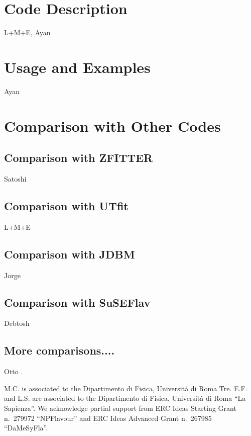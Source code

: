 \documentclass[aps,superscriptaddress,nofootinbib,floatfix,notitlepage]{revtex4-1}
\begin{document}
\section{Code Description}
\label{sec:Code}
L+M+E, Ayan
\section{Usage and Examples}
\label{sec:Usage}
Ayan
\section{Comparison with Other Codes}
\label{sec:Comparison}

\subsection{Comparison with ZFITTER}
\label{sec:ZFitter}
Satoshi
\subsection{Comparison with UTfit}
\label{sec:UTfit}
L+M+E
\subsection{Comparison with JDBM}
\label{sec:JDBM}
Jorge
\subsection{Comparison with SuSEFlav}
\label{sec:Debtosh}
Debtosh
\subsection{More comparisons....}
\label{sec:more}
Otto
\cite{hep-ph/9412201,hep-ph/9908433,hep-ph/0507146,1302.1395}.


\acknowledgments
M.C. is associated to the Dipartimento di Fisica, Universit\`a di Roma
Tre. E.F. and L.S. are associated to the Dipartimento di Fisica,
Universit\`a di Roma ``La Sapienza''. We acknowledge partial support
from ERC Ideas Starting Grant n.~279972 ``NPFlavour'' and ERC Ideas
Advanced Grant n.~267985 ``DaMeSyFla''.

%
\end{document}
